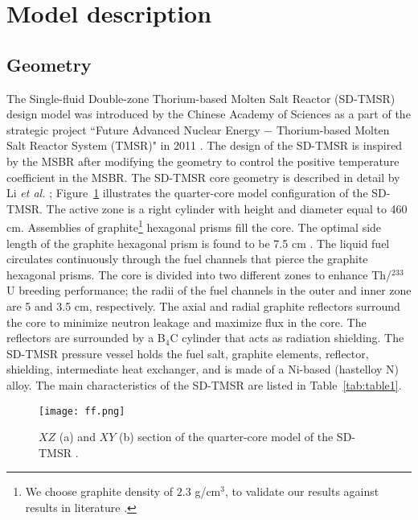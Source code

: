 \section{Model description} \label{Model-description}
\subsection{Geometry}
The Single-fluid Double-zone Thorium-based Molten Salt Reactor (SD-TMSR) design model was introduced by the Chinese Academy of Sciences as a part of  
the strategic project ``Future Advanced Nuclear Energy $-$ Thorium-based 
Molten Salt Reactor System (TMSR)" in 2011 
\cite{li_optimization_2018,jiang2012advanced,li2015analysis,li2017model}. The 
design of the \gls{SD-TMSR} is inspired by the \gls{MSBR} 
\cite{robertson_conceptual_1971} after modifying the geometry to 
control the positive temperature coefficient in the MSBR. The \gls{SD-TMSR} core 
geometry is described in detail by Li \emph{et al.} 
\cite{li_optimization_2018};
Figure~\ref{fig:ff} illustrates the quarter-core model configuration of the 
\gls{SD-TMSR}. The active zone is a right cylinder with height and diameter 
equal to 460 cm. Assemblies of graphite\footnote{We choose graphite density of 
$2.3$ g/cm$^3$, to validate our results against results in literature 
\cite{li_optimization_2018,nuttin2005potential}.} hexagonal prisms fill the 
core. The optimal side length of the graphite hexagonal prism is found to be 7.5 cm \cite{li_optimization_2018}. The liquid fuel circulates 
continuously through the fuel channels that pierce the graphite hexagonal 
prisms. The core is divided into two different zones to enhance 
Th/$^{233}$U breeding performance; the radii of the fuel channels in the 
outer and inner zone are 5 and 3.5 cm, respectively. The axial and radial 
graphite reflectors surround the core to minimize neutron leakage and 
maximize flux in the core. The reflectors are surrounded by a B${_4}$C cylinder 
that acts as radiation shielding. The \gls{SD-TMSR} pressure vessel holds 
the fuel salt, graphite elements, reflector, shielding, intermediate heat exchanger, and is made of a Ni-based (hastelloy N) alloy. The main 
characteristics of the \gls{SD-TMSR} are listed in Table~\ref{tab:table1}.

\begin{figure} %
	\texttt{[image: ff.png]}
	\caption{$XZ$ (a) and $XY$ (b) section of the quarter-core model of the 
	SD-TMSR \cite{ashraf2019Preliminary}.}
	\label{fig:ff}
\end{figure}


